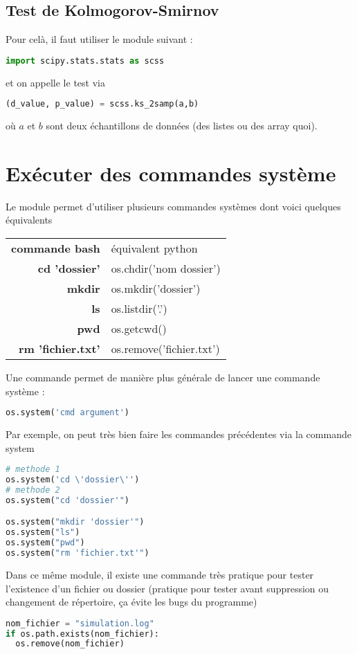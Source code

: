 \documentclass[a4paper,twoside]{article}
\begin{document}
\subsection{Test de Kolmogorov-Smirnov}
Pour celà, il faut utiliser le module suivant :
\begin{lstlisting}[language=python]
import scipy.stats.stats as scss
\end{lstlisting}
et on appelle le test via
\begin{lstlisting}[language=python]
(d_value, p_value) = scss.ks_2samp(a,b)
\end{lstlisting}
où $a$ et $b$ sont deux échantillons de données (des listes ou des array quoi).





\section{Exécuter des commandes système}
Le module  permet d'utiliser plusieurs commandes systèmes dont voici quelques équivalents

\begin{tabular}{>{\bfseries}r<{}@{ : }p{11cm}}
commande bash & équivalent python\\
cd 'dossier' & os.chdir('nom dossier')\\
mkdir & os.mkdir('dossier')\\
ls & os.listdir('.')\\
pwd & os.getcwd()\\
rm 'fichier.txt' & os.remove('fichier.txt')
\end{tabular}

Une commande permet de manière plus générale de lancer une commande système :
\begin{lstlisting}[language=python]
os.system('cmd argument')
\end{lstlisting}

Par exemple, on peut très bien faire les commandes précédentes via la commande system
\begin{lstlisting}[language=python]
# methode 1
os.system('cd \'dossier\'')
# methode 2
os.system("cd 'dossier'")

os.system("mkdir 'dossier'")
os.system("ls")
os.system("pwd")
os.system("rm 'fichier.txt'")
\end{lstlisting}

Dans ce même module, il existe une commande très pratique pour tester l'existence d'un fichier ou dossier (pratique pour tester avant suppression ou changement de répertoire, ça évite les bugs du programme)
\begin{lstlisting}[language=python]
nom_fichier = "simulation.log"
if os.path.exists(nom_fichier):
  os.remove(nom_fichier)
\end{lstlisting}
\end{document}
